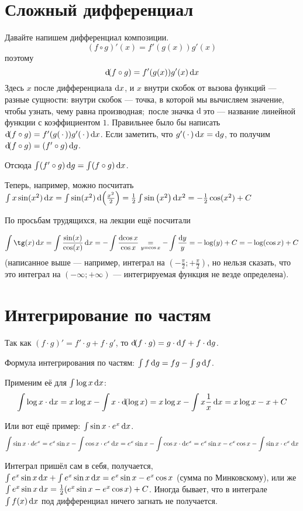 \documentclass[a4paper]{report}
\begin{document}
    \section{Сложный дифференциал}
    Давайте напишем дифференциал композиции. \[(f \circ g)'(x) = f'(g(x)) g'(x)\] поэтому \[\operatorname{d}\!(f \circ g) = f'(g(x))g'(x)\operatorname{d}\! x\]
    Здесь $x$ после дифференциала $\operatorname{d}\! x$, и $x$ внутри скобок от вызова функций --- разные сущности: внутри скобок --- точка, в которой мы вычисляем значение, чтобы узнать, чему равна производная;\ после значка $\operatorname{d}\!$ это --- название линейной функции с коэффициентом $1$.
    Правильнее было бы написать $\operatorname{d}\!(f \circ g) = f'(g(\,\cdot\,)) g'(\,\cdot\,)\operatorname{d}\! x$.
    Если заметить, что $g'(\,\cdot\,)\operatorname{d}\! x = \operatorname{d}\! g$, то получим $\operatorname{d}\!(f \circ g) = (f' \circ g) \operatorname{d}\! g$.

    Отсюда $\int (f' \circ g) \operatorname{d}\! g = \int (f \circ g) \operatorname{d}\! x$.

    Теперь, например, можно посчитать ${\int x \sin(x^2) \operatorname{d}\! x = \int \sin(x^2) \operatorname{d}\!\left(\frac{x^2}2\right) = \frac{1}{2}\int \sin\left(x^2\right)\operatorname{d}\! x^2 = -\frac{1}{2}\cos(x^2) + C}$

    По просьбам трудящихся, на лекции ещё посчитали

    \[\int \tg(x) \d x = \int \frac{\sin(x)}{\cos(x)}\d x = -\int \frac{\d \cos x}{\cos x} \underset{y = \cos x}{=} -\int \frac{\d y}{y} = -\log(y) + C = -\log(\cos x) + C\]
    (написанное выше --- например, интеграл на $\left(-\frac{\pi}2; +\frac{\pi}2\right)$, но нельзя сказать, что это интеграл на $(-\infty; +\infty)$ --- интегрируемая функция не везде определена).


    \section{Интегрирование по частям}
    Так как $(f \cdot g)' = f' \cdot g + f \cdot g'$, то $\operatorname{d}\!(f \cdot g) = g \cdot \operatorname{d}\! f + f \cdot \operatorname{d}\! g$.

    Формула интегрирования по частям: $\int f \operatorname{d}\! g =fg - \int g \operatorname{d}\! f$.

    Применим её для $\int \log x \operatorname{d}\! x$:
    \[\int \log x\cdot \operatorname{d}\! x = x \log x - \int x\cdot \operatorname{d}\!(\log x) = x\log x - \int x\frac{1}x\operatorname{d}\! x = x\log x - x + C\]

    Или вот ещё пример: $\int \sin x \cdot e^x \operatorname{d}\! x$. \[\int \sin x\cdot d e^x = e^x \sin x - \int \cos x \cdot e^x \operatorname{d}\! x = e^x \sin x - \int \cos x \cdot\operatorname{d}\! e^x = e^x \sin x - e^x \cos x - \int \sin x \cdot e^x \operatorname{d}\! x\]

    Интеграл пришёл сам в себя, получается, $\int e^x\sin x \operatorname{d}\! x + \int e^x\sin x \operatorname{d}\! x = e^x\sin x - e^x\cos x$ (сумма по Минковскому), или же $ \int e^x\sin x \operatorname{d}\! x = \frac12(e^x\sin x - e^x\cos x) + C$.
    \ok
    Иногда бывает, что в интеграле $\int f(x) \operatorname{d}\! x$ под дифференциал ничего загнать не получается.
\end{document}
